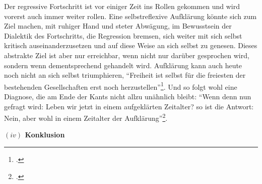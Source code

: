 \documentclass[a4paper, 12pt]{article}
\begin{document}
\begin{onehalfspace}
Der regressive Fortschritt ist vor einiger Zeit ins Rollen gekommen und wird vorerst auch immer weiter rollen. Eine selbstreflexive Aufklärung könnte sich zum Ziel machen, mit ruhiger Hand und steter Abwägung, im Bewusstsein der Dialektik des Fortschritts, die Regression bremsen, sich weiter mit sich selbst kritisch auseinanderzusetzen und auf diese Weise an sich selbst zu genesen. Dieses abstrakte Ziel ist aber nur erreichbar, wenn nicht nur darüber gesprochen wird, sondern wenn dementsprechend gehandelt wird. Aufklärung kann auch heute noch nicht an sich selbst triumphieren, "`Freiheit ist selbst für die freiesten der bestehenden Gesellschaften erst noch herzustellen"'\footnote{\Cite[Siehe][S. 98]{marcuse}.}. Und so folgt wohl eine Diagnose, die am Ende der Kants nicht allzu unähnlich bleibt: "`Wenn denn nun gefragt wird: Leben wir jetzt in einem aufgeklärten Zeitalter? so ist die Antwort: Nein, aber wohl in einem Zeitalter der Aufklärung"'\footnote{\Cite[Siehe][S. 491]{kant}.}.

\vspace{5mm}
%
%
%
\noindent\textbf{$(iv)$ Konklusion}


\end{onehalfspace}
\end{document}
